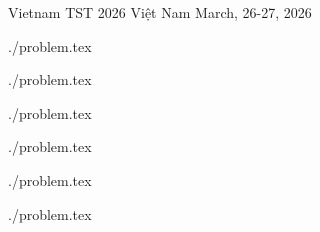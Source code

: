 \documentclass [11pt, a4paper, oneside] {article}
\begin{document}
\contest
{Vietnam TST 2026}%
{Việt Nam}%
{March, 26-27, 2026}%


\renewcommand{\t}{\texttt}
\renewcommand{\thefootnote}{\fnsymbol{footnote}}


\graphicspath{{../../problems/vnm-tst-26-cstation/statements/vietnamese/}}
  \def\ProblemIndex{A}
{./problem.tex}
\graphicspath{{../../problems/vnm-tst-26-colorful/statements/vietnamese/}}
  \def\ProblemIndex{B}
{./problem.tex}
\graphicspath{{../../problems/vnm-tst-26-magician/statements/vietnamese/}}
  \def\ProblemIndex{C}
{./problem.tex}
\graphicspath{{../../problems/vnm-tst-26-sgame/statements/vietnamese/}}
  \def\ProblemIndex{D}
{./problem.tex}
\graphicspath{{../../problems/vnm-tst-26-vmachine/statements/vietnamese/}}
  \def\ProblemIndex{E}
{./problem.tex}
\graphicspath{{../../problems/vnm-tst-26-festival/statements/vietnamese/}}
  \def\ProblemIndex{F}
{./problem.tex}
\end{document}
